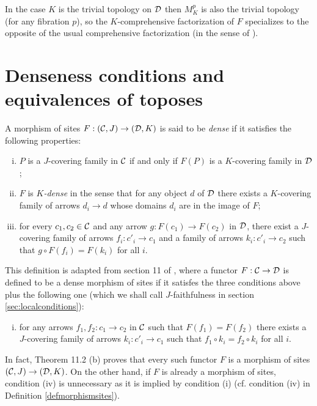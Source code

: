 \documentclass[a4paper,12pt]{article}
\begin{document}
\begin{remark}
	In the case $K$ is the trivial topology on $\cal D$ then $M^{p}_{K}$ is also the trivial topology (for any fibration $p$), so the $K$-comprehensive factorization of $F$ specializes to the opposite of the usual comprehensive factorization (in the sense of \cite{RossWalters}). 
\end{remark} 


\section{Denseness conditions and equivalences of toposes}\label{sec:denseness}


\begin{definition}
	A morphism of sites $F:({\cal C}, J)\to ({\cal D}, K)$ is said to be \emph{dense} if it satisfies the following properties:
	\begin{enumerate}[(i)]	
		\item $P$ is a $J$-covering family in $\cal C$ if and only if $F(P)$ is a $K$-covering family in $\cal D$;
		\item $F$ is \emph{$K$-dense} in the sense that for any object $d$ of $\cal D$ there exists a $K$-covering family of arrows $d_{i}\to d$ whose domains $d_{i}$ are in the image of $F$;
		\item for every $c_{1}, c_{2}\in {\cal C}$ and any arrow $g:F(c_{1})\to F(c_{2})$ in $\cal D$, there exist a $J$-covering family of arrows $f_{i}:c'_{i}\to c_{1}$ and a family of arrows $k_{i}:c'_{i}\to c_{2}$ such that $g\circ F(f_{i})=F(k_{i})$ for all $i$.
	\end{enumerate}
\end{definition}

\begin{remark}\label{remmorphismsofsitesfaithfulness}
	This definition is adapted from section 11 of \cite{Shulman}, where a functor $F:{\cal C}\to {\cal D}$ is defined to be a dense morphism of sites if it satisfes the three conditions above plus the following one (which we shall call $J$-faithfulness in section \ref{sec:localconditions}): 
	\begin{enumerate}[(i)]
	\item[(iv)] for any arrows $f_{1}, f_{2}:c_{1}\to c_{2}$ in $\cal C$ such that $F(f_1)=F(f_2)$ there exists a $J$-covering family of arrows $k_{i}:c'_{i}\to c_{1}$ such that $f_1 \circ k_{i}=f_{2}\circ k_{i}$ for all $i$. 
    \end{enumerate}
	In fact, Theorem 11.2 \cite{Shulman}(b) proves that every such functor $F$ is a morphism of sites $({\cal C}, J)\to ({\cal D}, K)$. On the other hand, if $F$ is already a morphism of sites, condition (iv) is unnecessary as it is implied by condition (i) (cf. condition (iv) in Definition \ref{defmorphismsites}).  
	
\end{remark}
\end{document}
